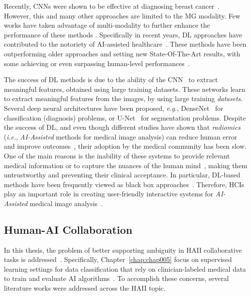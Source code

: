 Recently, \acp{CNN} were shown to be effective at diagnosing breast cancer~\cite{carneiro2017automated}.
However, this and many other approaches \cite{wang2016discrimination, becker2017deep, khan2019novel} are limited to the \ac{MG} modality.
Few works have taken advantage of multi-modality to further enhance the performance of these methods \cite{murtaza2019deep}.
Specifically in recent years, \ac{DL} approaches have contributed to the notoriety of \ac{AI}-assisted healthcare~\cite{topol2019high}.
These methods have been outperforming older approaches and setting  new State-Of-The-Art results, with some achieving or even surpassing human-level performances~\cite{esteva2017dermatologist, gale2017detecting}.

The success of \ac{DL} methods is due to the ability of the \ac{CNN}~\cite{greenspan2016guest} to extract meaningful features, obtained using large training datasets.
These networks learn to extract meaningful features from the images, by using large training {\it datasets}. Several deep neural architectures have been proposed, {\it e.g.}, DenseNet~\cite{Huang_2017_CVPR} for classification (diagnosis) problems, or U-Net~\cite{ronneberger2015u} for segmentation problems.
Despite the success of DL, and even though different studies have shown that {\it radiomics} ({\it i.e.}, {\it AI-Assisted} methods for medical image analysis) can reduce human error and improve outcomes~\cite{Cai:2019:HTC:3290605.3300234,delvaux2017effects,middleton2016clinical}, their adoption by the medical community has been slow.
One of the main reasons is the inability of these systems to provide relevant medical information or to capture the nuances of the human mind~\cite{khairat2018reasons, kohli2018cad, 10.1145/2858036.2858373}, making them untrustworthy and preventing their clinical acceptance.
In particular, DL-based methods have been frequently viewed as black box approaches~\cite{litjens2017survey}.
Therefore, HCIs play an important role in creating user-friendly interactive systems for {\it AI-Assisted} medical image analysis~\cite{10.1145/3132272.3134111}.

\subsection{Human-AI Collaboration}
\label{sec:sec005002002}

In this thesis, the problem of better supporting ambiguity in \ac{HAII} collaborative tasks is addressed~\cite{10.1145/3313831.3376506}.
Specifically, Chapter~\ref{chap:chap005} focus on supervised learning settings for data classification that rely on clinician-labeled medical data to train and evaluate \ac{AI} algorithms~\cite{SchaekermannMike2020}.
To accomplish these concerns, several literature works were addressed across the \ac{HAII} topic.

